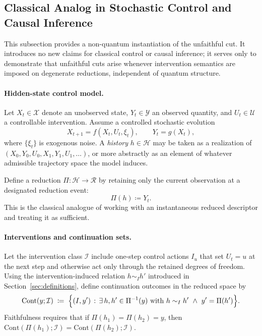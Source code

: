 \subsection{Classical Analog in Stochastic Control and Causal Inference}
\label{sec:classical-analog}

This subsection provides a non-quantum instantiation of the unfaithful cut.
It introduces no new claims for classical control or causal inference; it
serves only to demonstrate that unfaithful cuts arise whenever intervention
semantics are imposed on degenerate reductions, independent of quantum
structure.

\paragraph{Hidden-state control model.}
Let $X_t \in \mathcal{X}$ denote an unobserved state, $Y_t \in \mathcal{Y}$
an observed quantity, and $U_t \in \mathcal{U}$ a controllable intervention.
Assume a controlled stochastic evolution
\begin{equation}
  X_{t+1} = f(X_t, U_t, \xi_t),
  \qquad
  Y_t = g(X_t),
  \label{eq:classical-hidden-state}
\end{equation}
where $\{\xi_t\}$ is exogenous noise. A \emph{history} $h \in \mathcal{H}$
may be taken as a realization of $(X_0, Y_0, U_0, X_1, Y_1, U_1, \dots)$,
or more abstractly as an element of whatever admissible trajectory space
the model induces.

Define a reduction $\Pi:\mathcal{H}\to\mathcal{R}$ by retaining only the
current observation at a designated reduction event:
\begin{equation}
  \Pi(h) \coloneqq Y_t.
  \label{eq:classical-reduction}
\end{equation}
This is the classical analogue of working with an instantaneous reduced
descriptor and treating it as sufficient.

\paragraph{Interventions and continuation sets.}
Let the intervention class $\mathcal{I}$ include one-step control actions
$I_u$ that set $U_t=u$ at the next step and otherwise act only through the
retained degrees of freedom. Using the intervention-induced relation
$h \sim_{I} h'$ introduced in Section~\ref{sec:definitions}, define
continuation outcomes in the reduced space by
\begin{equation}
  \mathrm{Cont}(y;\mathcal{I})
  \;\coloneqq\;
  \Bigl\{ (I, y') \,:\,
  \exists\, h,h' \in \Pi^{-1}(y)\ \text{with}\ h \sim_{I} h'
  \ \wedge\ y'=\Pi(h') \Bigr\}.
  \label{eq:classical-cont}
\end{equation}
Faithfulness requires that if $\Pi(h_1)=\Pi(h_2)=y$, then
$\mathrm{Cont}(\Pi(h_1);\mathcal{I})=\mathrm{Cont}(\Pi(h_2);\mathcal{I})$.

